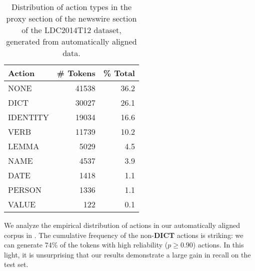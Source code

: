 \documentclass[11pt]{article}
\newcommand\w[1]{\textit{#1}} %
\begin{document}
\begin{table}[t]
\begin{center}
\begin{tabular}{l|rr}
\bf Action & \bf \# Tokens & \bf \% Total \\ \hline
NONE & 41538 & 36.2 \\
DICT & 30027 & 26.1 \\
IDENTITY & 19034 & 16.6 \\
VERB & 11739 & 10.2 \\
LEMMA & 5029 & 4.5 \\
NAME & 4537 & 3.9 \\
DATE & 1418 & 1.1 \\
PERSON & 1336 & 1.1 \\
VALUE & 122  & 0.1\\
\end{tabular}
\end{center}
\caption{\label{tab:distro} Distribution of action types in the proxy section of the newswire section of the LDC2014T12 dataset, generated from automatically aligned data. }
\end{table}

We analyze the empirical distribution of actions in our automatically aligned corpus in .
The cumulative frequency of the non-\textbf{DICT} actions is striking: we can generate 74\% of the tokens with high reliability ($p \geq 0.90$) actions.
In this light, it is unsurprising that our results demonstrate a large gain in recall on the test set.




\end{document}

